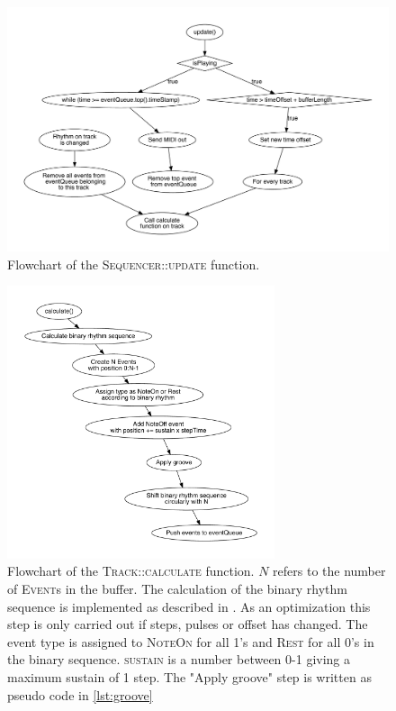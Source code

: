 \begin{figure}[H]
    \centering
    \includegraphics[width=\textwidth]{graphics/sequencer.pdf}
    \caption{Flowchart of the \textsc{Sequencer::update} function. }
    \label{fig:sequencer}
\end{figure}

\begin{figure}[H]
    \centering
    \includegraphics[width=0.7\textwidth]{graphics/calculate.pdf}
    \caption{Flowchart of the \textsc{Track::calculate} function. $N$ refers to the number of \textsc{Event}s in the buffer. The calculation of the binary rhythm sequence is implemented as described in \cite{bjorklund}. As an optimization this step is only carried out if steps, pulses or offset has changed. The event type is assigned to \textsc{NoteOn} for all 1's and \textsc{Rest} for all 0's in the binary sequence. \textsc{sustain} is a number between 0-1 giving a maximum sustain of 1 step. The "Apply groove" step is written as pseudo code in \cref{lst:groove}}
    \label{fig:calculate}
\end{figure}

